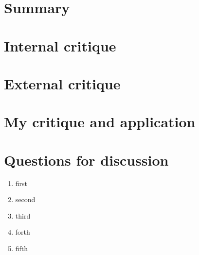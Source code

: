 \section{Summary}
\cite{roberts2015developing}

\section{Internal critique}
\cite{blanchard1998transforming}

\section{External critique}
\cite{bachmann2017ethical}

\section{My critique and application}
\cite{blackaby2011spiritual}

\section{Questions for discussion}

\begin{enumerate}
\item first
\item second
\item third
\item forth
\item fifth
\end{enumerate}
